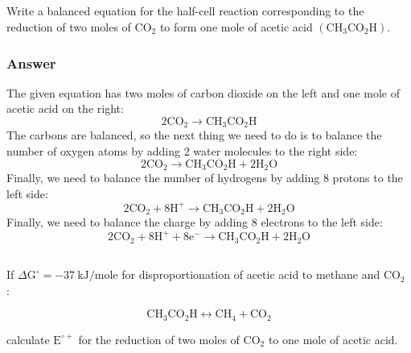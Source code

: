 \documentclass[12pt]{article}
\begin{document}
\subsection{}
Write a balanced equation for the half-cell reaction corresponding to the reduction of two moles of $\mathrm{CO}_{2}$ to form one mole of acetic acid $\left(\mathrm{CH}_{3} \mathrm{CO}_{2} \mathrm{H}\right)$.
\subsubsection{Answer}
The given equation has two moles of carbon dioxide on the left and one mole of acetic acid on the right:
\begin{equation}
2 \mathrm{CO}_{2}\rightarrow \mathrm{CH}_{3} \mathrm{CO}_{2} \mathrm{H}
\end{equation}
The carbons are balanced, so the next thing we need to do is to balance the number of oxygen atoms by adding 2 water molecules to the right side:
\begin{equation}
2 \mathrm{CO}_{2}\rightarrow \mathrm{CH}_{3} \mathrm{CO}_{2} \mathrm{H}+2 \mathrm{H}_{2} \mathrm{O}
\end{equation}
Finally, we need to balance the number of hydrogens by adding 8 protons to the left side:
\begin{equation}
2 \mathrm{CO}_{2}+8 \mathrm{H}^{+}\rightarrow \mathrm{CH}_{3} \mathrm{CO}_{2} \mathrm{H}+2 \mathrm{H}_{2} \mathrm{O}
\end{equation}
Finally, we need to balance the charge by adding 8 electrons to the left side:
\begin{equation}
2 \mathrm{CO}_{2}+8 \mathrm{H}^{+}+8 \mathrm{e}^{-}\rightarrow \mathrm{CH}_{3} \mathrm{CO}_{2} \mathrm{H}+2 \mathrm{H}_{2} \mathrm{O}
\end{equation}

\subsection{}
If $\Delta \mathrm{G}^{\circ}=-37 \mathrm{~kJ} / \mathrm{mole}$ for disproportionation of acetic acid to methane and $\mathrm{CO}_{2}$ :

$$
\mathrm{CH}_{3} \mathrm{CO}_{2} \mathrm{H} \leftrightarrow \mathrm{CH}_{4}+\mathrm{CO}_{2}
$$

calculate $\mathrm{E}^{\circ+}$ for the reduction of two moles of $\mathrm{CO}_{2}$ to one mole of acetic acid.
\end{document}
